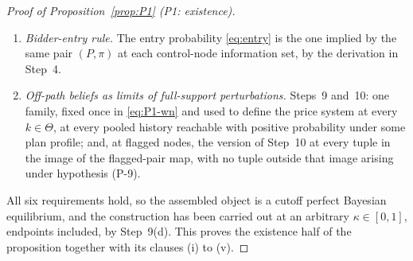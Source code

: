 \begin{proof}[Proof of Proposition~\ref{prop:P1} (P1: existence)]
\begin{enumerate}[label=(\roman*),leftmargin=2.4em,itemsep=3pt]
  pooled family and Step~6 for the measurable flagged family, both solving
  $P(\mathcal I) = \Eop[Y \mid \mathcal I]$ by Step~4 --- at the beliefs of (iii) where the history
  carries positive probability under $k^\star$, and at Step~9(b)'s limit belief at the reachable
  histories that do not, since those are the histories the deviation payoffs defining $\Tmap$ read.
  At unreachable histories the requirement asks nothing and Step~9(c)'s convention supplies a value
  that is itself an inner root.
\item \emph{Bidder-entry rule.} The entry probability \eqref{eq:entry} is the one implied by the same
  pair $(P,\pi)$ at each control-node information set, by the derivation in Step~4.
\item \emph{Off-path beliefs as limits of full-support perturbations.} Steps~9 and~10: one family,
  fixed once in \eqref{eq:P1-wn} and used to define the price system at every $k \in \Theta$, at
  every pooled history reachable with positive probability under some plan profile; and, at flagged
  nodes, the version of Step~10 at every tuple in the image of the flagged-pair map, with no tuple
  outside that image arising under hypothesis (P-9).
\end{enumerate}

All six requirements hold, so the assembled object is a cutoff perfect Bayesian equilibrium, and the
construction has been carried out at an arbitrary $\kappa \in [0,1]$, endpoints included, by
Step~9(d). This proves the existence half of the proposition together with its clauses (i) to (v).


\end{proof}
